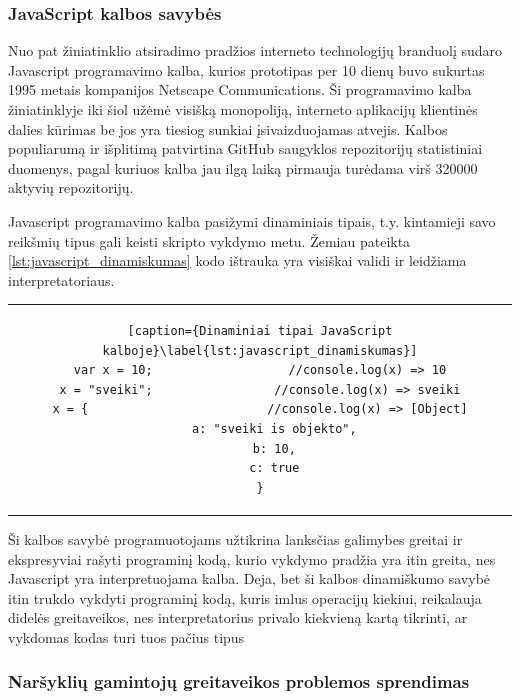 \documentclass{VUMIFPSkursinis}
\begin{document}
\subsubsection{JavaScript kalbos savybės}

Nuo pat žiniatinklio atsiradimo pradžios interneto technologijų branduolį sudaro Javascript programavimo kalba, kurios prototipas per 10 dienų buvo sukurtas 1995 metais kompanijos Netscape Communications. Ši programavimo kalba žiniatinklyje iki šiol užėmė visišką monopoliją, interneto aplikacijų klientinės dalies kūrimas be jos yra tiesiog sunkiai įsivaizduojamas atvejis. Kalbos populiarumą ir išplitimą patvirtina GitHub saugyklos repozitorijų statistiniai duomenys, pagal kuriuos kalba jau ilgą laiką pirmauja turėdama virš 320000 aktyvių repozitorijų. 


Javascript programavimo kalba pasižymi dinaminiais tipais, t.y. kintamieji savo reikšmių tipus gali keisti skripto vykdymo metu. Žemiau pateikta \ref{lst:javascript_dinamiskumas} kodo ištrauka yra visiškai validi ir leidžiama interpretatoriaus.

\begin{center}
\begin{tabular}{c}
\begin{lstlisting}[caption={Dinaminiai tipai JavaScript kalboje}\label{lst:javascript_dinamiskumas}]
var x = 10;                   //console.log(x) => 10
x = "sveiki";                 //console.log(x) => sveiki
x = {                         //console.log(x) => [Object]
    a: "sveiki is objekto",
    b: 10,
    c: true
}
\end{lstlisting}
\end{tabular}
\end{center}

Ši kalbos savybė programuotojams užtikrina lanksčias galimybes greitai ir ekspresyviai rašyti programinį kodą, kurio vykdymo pradžia yra itin greita, nes Javascript yra interpretuojama kalba. Deja, bet ši kalbos dinamiškumo savybė itin trukdo vykdyti programinį kodą, kuris imlus operacijų kiekiui, reikalauja didelės greitaveikos, nes interpretatorius privalo kiekvieną kartą tikrinti, ar vykdomas kodas turi tuos pačius tipus 

\subsubsection{Naršyklių gamintojų greitaveikos problemos sprendimas}
\end{document}
